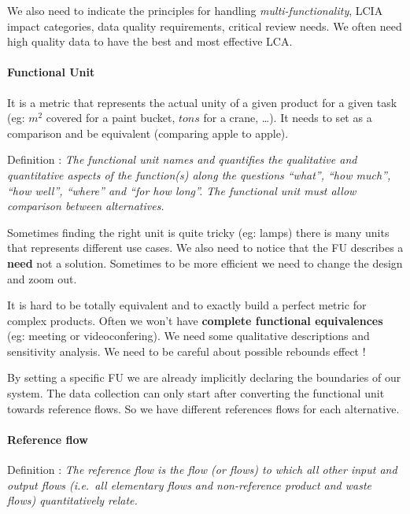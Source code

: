 We also need to indicate the principles for handling
\emph{multi-functionality}, LCIA impact categories, data quality
requirements, critical review needs. We often need high quality data to
have the best and most effective LCA.

\hypertarget{functional-unit}{%
\paragraph{Functional Unit}\label{functional-unit}}

It is a metric that represents the actual unity of a given product for a
given task (eg: \(m^2\) covered for a paint bucket, \(tons\) for a
crane, \ldots). It needs to set as a comparison and be equivalent
(comparing apple to apple).

Definition : \emph{The functional unit names and quantifies the
qualitative and quantitative aspects of the function(s) along the
questions ``what'', ``how much'', ``how well'', ``where'' and ``for how
long''. The functional unit must allow comparison between alternatives.}

Sometimes finding the right unit is quite tricky (eg: lamps) there is
many units that represents different use cases. We also need to notice
that the FU describes a \textbf{need} not a solution. Sometimes to be
more efficient we need to change the design and zoom out.

It is hard to be totally equivalent and to exactly build a perfect
metric for complex products. Often we won't have \textbf{complete
functional equivalences} (eg: meeting or videoconfering). We need some
qualitative descriptions and sensitivity analysis. We need to be careful
about possible rebounds effect !

By setting a specific FU we are already implicitly declaring the
boundaries of our system. The data collection can only start after
converting the functional unit towards reference flows. So we have
different references flows for each alternative.

\hypertarget{reference-flow}{%
\paragraph{Reference flow}\label{reference-flow}}

Definition : \emph{The reference flow is the flow (or flows) to which
all other input and output flows (i.e.~all elementary flows and
non-reference product and waste flows) quantitatively relate.}

